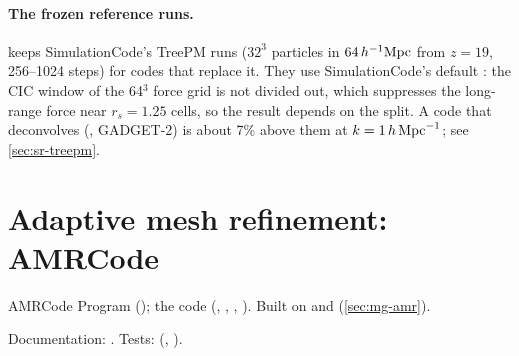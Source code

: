 \paragraph*{The frozen reference runs.}  keeps SimulationCode's TreePM
runs ($32^3$ particles in $64\,h^{-1}\mathrm{Mpc}$ from $z=19$, 256--1024 steps) for codes that replace it. They use SimulationCode's
default  : the CIC window of the 64$^3$ force grid is not divided out,
which suppresses the long-range force near $r_s=1.25$ cells, so the result depends on the split. A code that
deconvolves (, GADGET-2) is about 7\% above them at $k=1\,h\,\mathrm{Mpc}^{-1}$; see \cref{sec:sr-treepm}.

\section{Adaptive mesh refinement: AMRCode}\label{sec:sr-amr}

\begin{modulebox}{AMRCode}
Program  (); the code  (,
, , ). Built on
 and  (\cref{sec:mg-amr}).\par
Documentation: . Tests:  (,
).
\end{modulebox}

